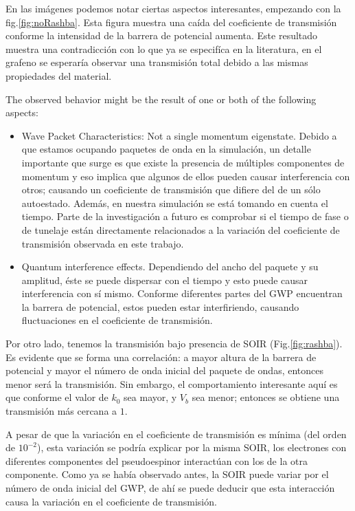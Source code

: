 \documentclass[twocolumn]{revtex4-2}
\begin{document}
    En las imágenes podemos notar ciertas aspectos interesantes, empezando con la fig.\ref{fig:noRashba}.
    Esta figura muestra una caída del coeficiente de transmisión conforme la intensidad de la barrera de potencial aumenta.
    Este resultado muestra una contradicción con lo que ya se especifíca en la literatura, en el grafeno se esperaría observar una transmisión total debido a las mismas propiedades del material\cite{horsell2008, Young2009}.

    The observed behavior might be the result of one or both of the following aspects:

    \begin{itemize}
        \item Wave Packet Characteristics:
        Not a single momentum eigenstate.
        Debido a que estamos ocupando paquetes de onda en la simulación, un detalle importante que surge es que existe la presencia de múltiples componentes de momentum y eso implica que algunos de ellos pueden causar interferencia con otros; causando un coeficiente de transmisión que difiere del de un sólo autoestado\cite{Staelens2021}.
        Además, en nuestra simulación se está tomando en cuenta el tiempo.
        Parte de la investigación a futuro es comprobar si el tiempo de fase o de tunelaje están directamente relacionados a la variación del coeficiente de transmisión observada en este trabajo.
        \item Quantum interference effects\cite{MolgadoMex2018}.
        Dependiendo del ancho del paquete y su amplitud, éste se puede dispersar con el tiempo y esto puede causar interferencia con sí mismo.
        Conforme diferentes partes del GWP encuentran la barrera de potencial, estos pueden estar interfiriendo, causando fluctuaciones en el coeficiente de transmisión.
    \end{itemize}

    Por otro lado, tenemos la transmisión bajo presencia de SOIR (Fig.\ref{fig:rashba}).
    Es evidente que se forma una correlación: a mayor altura de la barrera de potencial y mayor el número de onda inicial del paquete de ondas, entonces menor será la transmisión.
    Sin embargo, el comportamiento interesante aquí es que conforme el valor de $k_0$ sea mayor, y $V_b$ sea menor; entonces se obtiene una transmisión más cercana a $1$.

    A pesar de que la variación en el coeficiente de transmisión es mínima (del orden de $10^{-2}$), esta variación se podría explicar por la misma SOIR, los electrones con diferentes componentes del pseudoespinor interactúan con los de la otra componente.
    Como ya se había observado antes\cite{Serna2019}, la SOIR puede variar por el número de onda inicial del GWP, de ahí se puede deducir que esta interacción causa la variación en el coeficiente de transmisión.
\end{document}
